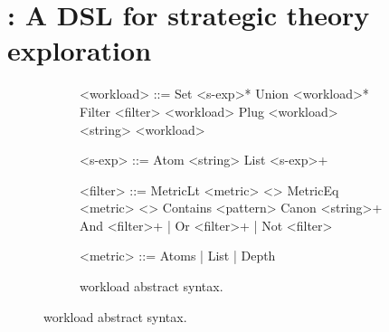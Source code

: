 \section{\enumo: A DSL for strategic theory exploration}
\label{sec:slide}

\renewcommand\denote[1]{\ensuremath{\left\llbracket #1 \right\rrbracket}}
\newcommand\set[2]{\ensuremath{\left\{#1 \hspace{3pt} \left\vert \hspace{3pt} #2 \right.\right\}}}
\newcommand\plugsexp{\ensuremath{\mathsf{plug\_sexp}}}

\begin{figure}
  \begin{subfigure}{\linewidth}
    \begin{minipage}[t]{0.45\linewidth}
      \begin{grammar}
      <workload> ::=  Set <s-exp>*
        \alt Union <workload>*
        \alt Filter <filter> <workload>
        \alt Plug <workload> <string> <workload>

      <s-exp> ::=  Atom <string> \alt List <s-exp>+

      \end{grammar}
    \end{minipage}\hfill%
    \begin{minipage}[t]{0.5\linewidth}
      \begin{grammar}

      <filter> ::=
        MetricLt <metric> <\N>
        \alt MetricEq <metric> <\N>
        \alt Contains <pattern>
        \alt Canon <string>+
        \alt And <filter>+ | Or <filter>+ | Not <filter>

      <metric> ::= Atoms | List | Depth
      \end{grammar}%
      \end{minipage}%
    \caption{\enumo workload abstract syntax.}
    \label{fig:workload-grammar}
  \end{subfigure}


\end{figure}
